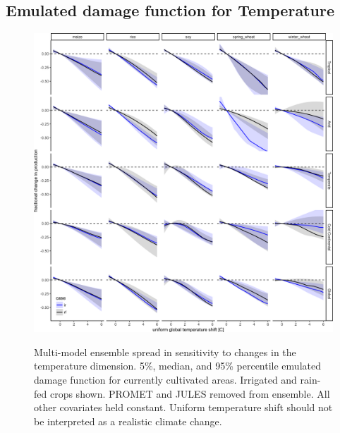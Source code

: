 \documentclass[10pt]{article}
\begin{document}
\subsection{Emulated damage function for Temperature}
\begin{figure}[h!]
\includegraphics[width=\textwidth]{s_temp.png}\\
\caption{Multi-model ensemble spread in sensitivity to changes in the temperature dimension. 5\%, median, and 95\% percentile emulated damage function for currently cultivated areas. Irrigated and rain-fed crops shown. PROMET and JULES removed from ensemble. All other covariates held constant. Uniform temperature shift should not be interpreted as a realistic climate change.}
\label{fig:temperature}
\end{figure}

\clearpage
\end{document}
